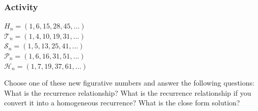 \documentclass{beamer}
\begin{document}
\frame
{
  \frametitle{Activity}

$H_n=(1,6,15,28, 45, \ldots)$\\
$\mathcal{T}_n=(1,4,10,19,31, \ldots)$\\
$\mathcal{S}_n=(1,5,13,25,41, \ldots)$\\
$\mathcal{P}_n=(1,6,16,31,51, \ldots)$\\
$\mathcal{H}_n=(1,7,19,37,61, \ldots)$\\
\vfill

Choose one of these new figurative numbers and answer the following questions:  What is the recurrence relationship?  What is the recurrence relationship if you convert it into a homogeneous recurrence? What is the close form solution?

\vfill
}
\end{document}
